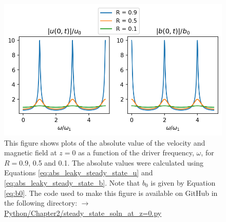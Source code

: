 \begin{figure}
    \centering
    \vspace{-20pt}
    \includegraphics[width=\textwidth,height=0.9\textheight,keepaspectratio]{figures/chapter02/steady_state_soln_at_z=0.png}
    \vspace{-30pt}
    \caption{This figure shows plots of the absolute value of the velocity and magnetic field at $z=0$ as a function of the driver frequency, $\omega$, for $R=0.9$, 0.5 and 0.1. The absolute values were calculated using Equations \eqref{eq:abs_leaky_steady_state_u} and \eqref{eq:abs_leaky_steady_state_b}. Note that $b_0$ is given by Equation \eqref{eq:b0}. The code used to make this figure is available on GitHub in the following directory:\newline
    \href{https://github.com/aleksyprok/apkp_thesis/blob/main/Python/Chapter2/steady_state_soln_at_z\%3D0.py}{$\rightarrow$ Python/Chapter2/steady\_state\_soln\_at\_z=0.py}}
    \label{fig:steady_state_soln_at_z=0}
\end{figure}

